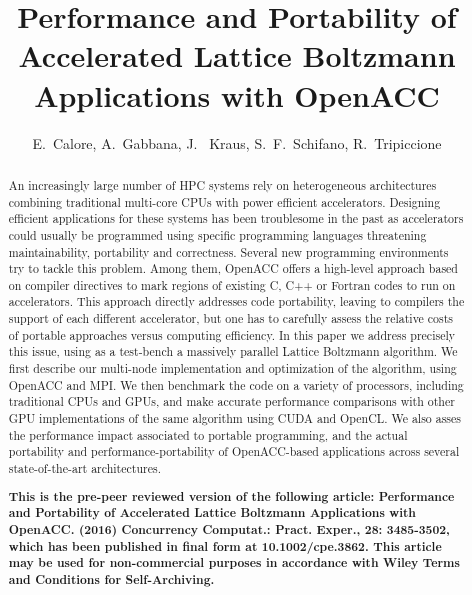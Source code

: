 \documentclass[times]{cpeauth}
\begin{document}


\title{Performance and Portability of Accelerated Lattice Boltzmann Applications with OpenACC}


\author{
E.~Calore, 
A.~Gabbana,
J.~ Kraus, 
S.~F.~Schifano\corrauth,
R.~Tripiccione
}

\address{
Dip. di Fisica e Scienze della Terra, University of Ferrara, and INFN, Ferrara (Italy)\break
{}NVIDIA GmbH, W\"urselen (Germany)\break
{}Dip. di Matematica e Informatica, University of Ferrara, and INFN, Ferrara (Italy)
}



\begin{abstract}

An increasingly large number of HPC systems rely on heterogeneous 
architectures combining traditional multi-core CPUs with power 
efficient accelerators.
%
Designing efficient applications for these systems has been troublesome 
in the past as accelerators could usually be programmed using specific 
programming languages threatening maintainability, portability and 
correctness.
%
Several new programming environments try to tackle this problem. 
Among them, OpenACC offers a high-level approach based on compiler 
directives to mark regions of existing C, C++ or Fortran codes 
to run on accelerators.
%
This approach directly addresses code portability, leaving to compilers 
the support of each different accelerator, but one has to carefully 
assess the relative costs of portable approaches versus computing efficiency. 
%
In this paper we address precisely this issue, using as a test-bench 
a massively parallel Lattice Boltzmann algorithm. We first describe 
our multi-node implementation and optimization of the algorithm, 
using OpenACC and MPI. 
We then benchmark the code on a variety of processors, including 
traditional CPUs and GPUs, and make accurate performance comparisons 
with other GPU implementations of the same algorithm using CUDA 
and OpenCL. We also asses the performance impact associated to portable 
programming, and the actual portability and performance-portability 
of OpenACC-based applications across several state-of-the-art architectures.


\textbf{This is the pre-peer reviewed version of the following article: 
Performance and Portability of Accelerated Lattice Boltzmann Applications with OpenACC. (2016)
Concurrency Computat.: Pract. Exper., 28: 3485-3502, 
which has been published in final form at 10.1002/cpe.3862. 
This article may be used for non-commercial purposes in accordance with Wiley Terms and Conditions for Self-Archiving.}

\end{abstract}
\end{document}
